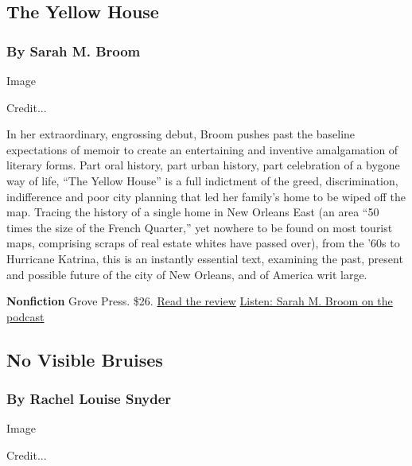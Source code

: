\hypertarget{the-yellow-house}{%
\subsection{The Yellow House}\label{the-yellow-house}}

\hypertarget{by-sarah-m-broom}{%
\subsubsection{By Sarah M. Broom}\label{by-sarah-m-broom}}

Image

Credit...

In her extraordinary, engrossing debut, Broom pushes past the baseline
expectations of memoir to create an entertaining and inventive
amalgamation of literary forms. Part oral history, part urban history,
part celebration of a bygone way of life, ``The Yellow House'' is a full
indictment of the greed, discrimination, indifference and poor city
planning that led her family's home to be wiped off the map. Tracing the
history of a single home in New Orleans East (an area ``50 times the
size of the French Quarter,'' yet nowhere to be found on most tourist
maps, comprising scraps of real estate whites have passed over), from
the '60s to Hurricane Katrina, this is an instantly essential text,
examining the past, present and possible future of the city of New
Orleans, and of America writ large.

\textbf{Nonfiction} \textbar{} Grove Press. \$26. \textbar{}
\href{https://www.nytimes3xbfgragh.onion/2019/08/09/books/review/the-yellow-house-sarah-m-broom.html}{Read
the review} \textbar{}
\href{https://www.nytimes3xbfgragh.onion/2019/08/30/books/review/podcast-christopher-ketcham-this-land.html}{Listen:
Sarah M. Broom on the podcast}

\hypertarget{no-visible-bruises}{%
\subsection{No Visible Bruises}\label{no-visible-bruises}}

\hypertarget{by-rachel-louise-snyder}{%
\subsubsection{By Rachel Louise Snyder}\label{by-rachel-louise-snyder}}

Image

Credit...

